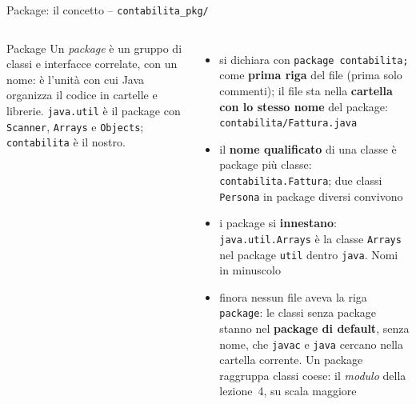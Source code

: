\documentclass[10pt,aspectratio=169]{beamer}
\begin{document}
\begin{frame}[fragile]{Package: il concetto -- \texttt{contabilita\_pkg/}}
\begin{columns}[T]
\begin{block}{Package}
\small Un \emph{package} è un gruppo di classi e interfacce correlate, con un nome: è l'unità con cui Java organizza il codice in cartelle e librerie. \texttt{java.util} è il package con \texttt{Scanner}, \texttt{Arrays} e \texttt{Objects}; \texttt{contabilita} è il nostro.
\end{block}
\footnotesize
\begin{itemize}\itemsep=2pt
    \item si dichiara con \texttt{package contabilita;} come \textbf{prima riga} del file (prima solo commenti); il file sta nella \textbf{cartella con lo stesso nome} del package: \texttt{contabilita/Fattura.java}
    \item il \textbf{nome qualificato} di una classe è package più classe: \texttt{contabilita.Fattura}; due classi \texttt{Persona} in package diversi convivono
    \item i package si \textbf{innestano}: \texttt{java.util.Arrays} è la classe \texttt{Arrays} nel package \texttt{util} dentro \texttt{java}. Nomi in minuscolo
    \item finora nessun file aveva la riga \texttt{package}: le classi senza package stanno nel \textbf{package di default}, senza nome, che \texttt{javac} e \texttt{java} cercano nella cartella corrente. Un package raggruppa classi coese: il \emph{modulo} della lezione~4, su scala maggiore
\end{itemize}

\end{columns}
\end{frame}
\end{document}
